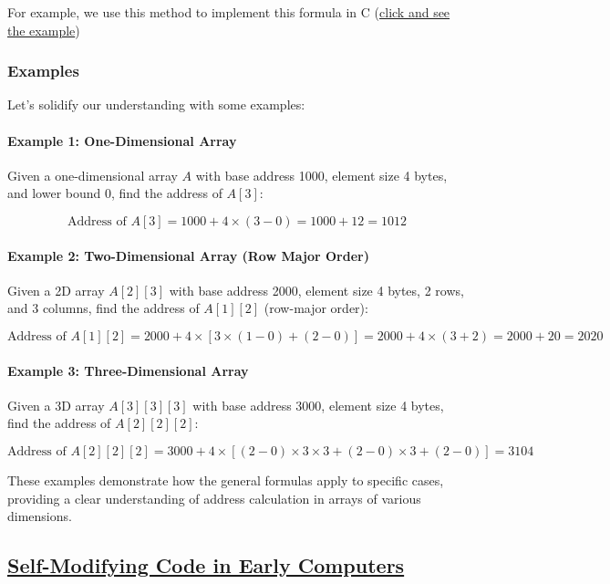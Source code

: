 \documentclass{book}
\begin{document}
For example, we use this method to implement this formula in C (\href{https://github.com/m-mdy-m/Arliz/blob/main/AddressCalculation/4D-Dimensional.c}{click and see the example})

\subsubsection{Examples}

Let’s solidify our understanding with some examples:

\paragraph{Example 1: One-Dimensional Array}
Given a one-dimensional array \( A \) with base address 1000, element size 4 bytes, and lower bound 0, find the address of \( A[3] \):

\[
\text{Address of } A[3] = 1000 + 4 \times (3 - 0) = 1000 + 12 = 1012
\]

\paragraph{Example 2: Two-Dimensional Array (Row Major Order)}
Given a 2D array \( A[2][3] \) with base address 2000, element size 4 bytes, 2 rows, and 3 columns, find the address of \( A[1][2] \) (row-major order):

\[
\text{Address of } A[1][2] = 2000 + 4 \times \left[ 3 \times (1 - 0) + (2 - 0) \right] = 2000 + 4 \times (3 + 2) = 2000 + 20 = 2020
\]

\paragraph{Example 3: Three-Dimensional Array}
Given a 3D array \( A[3][3][3] \) with base address 3000, element size 4 bytes, find the address of \( A[2][2][2] \):

\[\text{Address of } A[2][2][2] = 3000 + 4 \times \left[ (2 - 0) \times 3 \times 3 + (2 - 0) \times 3 + (2 - 0) \right] = 3104\]

These examples demonstrate how the general formulas apply to specific cases, providing a clear understanding of address calculation in arrays of various dimensions.


	\subsection{\href{https://en.wikipedia.org/wiki/Self-modifying_code}{Self-Modifying Code in Early Computers}}
	
\end{document}
